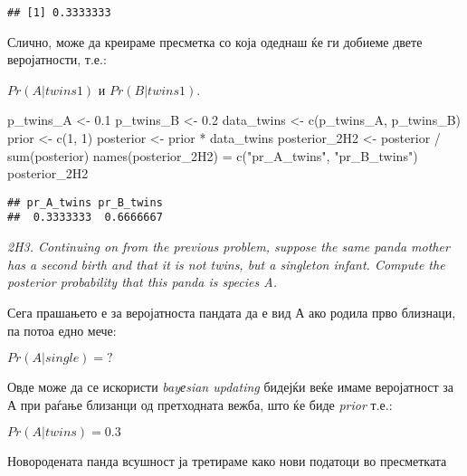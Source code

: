 \documentclass[
]{book}
\newenvironment{Shaded}{\begin{snugshade}}{\end{snugshade}}
\newcommand{\DecValTok}[1]{\textcolor[rgb]{0.00,0.00,0.81}{#1}}
\newcommand{\FloatTok}[1]{\textcolor[rgb]{0.00,0.00,0.81}{#1}}
\newcommand{\FunctionTok}[1]{\textcolor[rgb]{0.00,0.00,0.00}{#1}}
\newcommand{\NormalTok}[1]{#1}
\newcommand{\OtherTok}[1]{\textcolor[rgb]{0.56,0.35,0.01}{#1}}
\newcommand{\SpecialCharTok}[1]{\textcolor[rgb]{0.00,0.00,0.00}{#1}}
\newcommand{\StringTok}[1]{\textcolor[rgb]{0.31,0.60,0.02}{#1}}
\begin{document}
\begin{verbatim}
## [1] 0.3333333
\end{verbatim}

Слично, може да креираме пресметка со која одеднаш ќе ги добиеме двете веројатности, т.е.:

\(Pr(A|twins1)\) и \(Pr(B|twins1)\).

\begin{Shaded}
\begin{Highlighting}[]
\NormalTok{p\_twins\_A }\OtherTok{\textless{}{-}} \FloatTok{0.1}
\NormalTok{p\_twins\_B }\OtherTok{\textless{}{-}} \FloatTok{0.2}
\NormalTok{data\_twins }\OtherTok{\textless{}{-}} \FunctionTok{c}\NormalTok{(p\_twins\_A, p\_twins\_B)}
\NormalTok{prior }\OtherTok{\textless{}{-}} \FunctionTok{c}\NormalTok{(}\DecValTok{1}\NormalTok{, }\DecValTok{1}\NormalTok{)}
\NormalTok{posterior }\OtherTok{\textless{}{-}}\NormalTok{ prior }\SpecialCharTok{*}\NormalTok{ data\_twins}
\NormalTok{posterior\_2H2 }\OtherTok{\textless{}{-}}\NormalTok{ posterior }\SpecialCharTok{/} \FunctionTok{sum}\NormalTok{(posterior)}
\FunctionTok{names}\NormalTok{(posterior\_2H2) }\OtherTok{=} \FunctionTok{c}\NormalTok{(}\StringTok{"pr\_A\_twins"}\NormalTok{, }\StringTok{"pr\_B\_twins"}\NormalTok{)}
\NormalTok{posterior\_2H2}
\end{Highlighting}
\end{Shaded}

\begin{verbatim}
## pr_A_twins pr_B_twins 
##  0.3333333  0.6666667
\end{verbatim}

\emph{2H3. Continuing on from the previous problem, suppose the same panda mother has a second birth and that it is not twins, but a singleton infant. Compute the posterior probability that this panda is species A.}

Сега прашањето е за веројатноста пандата да е вид А ако родила прво близнаци, па потоа едно мече:

\(Pr(A|single) = ?\)

Овде може да се искористи \emph{bayеsian updating} бидејќи веќе имаме веројатност за А при раѓање близанци од претходната вежба, што ќе биде \emph{prior} т.е.:

\(Pr(A|twins) = 0.3\)

Новородената панда всушност ја третираме како нови податоци во пресметката
\end{document}
